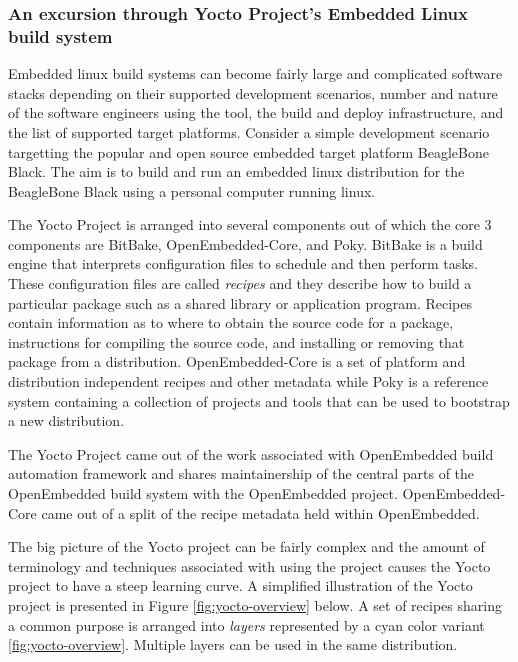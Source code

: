 \subsubsection{An excursion through Yocto Project's Embedded Linux build system}
\label{section:yocto-demo}

Embedded linux build systems can become fairly large and complicated software stacks depending on their supported development scenarios, number and nature of the software engineers using the tool, the build and deploy infrastructure, and the list of supported target platforms. Consider a simple development scenario targetting the popular and open source embedded target platform BeagleBone Black. The aim is to build and run an embedded linux distribution for the BeagleBone Black using a personal computer running linux.

The Yocto Project is arranged into several components out of which the core 3 components are BitBake, OpenEmbedded-Core, and Poky. BitBake is a build engine that interprets configuration files to schedule and then perform tasks. These configuration files are called \textit{recipes} and they describe how to build a particular package such as a shared library or application program. Recipes contain information as to where to obtain the source code for a package, instructions for compiling the source code, and installing or removing that package from a distribution. OpenEmbedded-Core is a set of platform and distribution independent recipes and other metadata while Poky is a reference system containing a collection of projects and tools that can be used to bootstrap a new distribution.

The Yocto Project came out of the work associated with OpenEmbedded build automation framework and shares maintainership of the central parts of the OpenEmbedded build system with the OpenEmbedded project. OpenEmbedded-Core came out of a split of the recipe metadata held within OpenEmbedded.

The big picture of the Yocto project can be fairly complex and the amount of terminology and techniques associated with using the project causes the Yocto project to have a steep learning curve. A simplified illustration of the Yocto project is presented in Figure \ref{fig:yocto-overview} below. A set of recipes sharing a common purpose is arranged into \textit{layers} represented by a cyan color variant \ref{fig:yocto-overview}. Multiple layers can be used in the same distribution.

